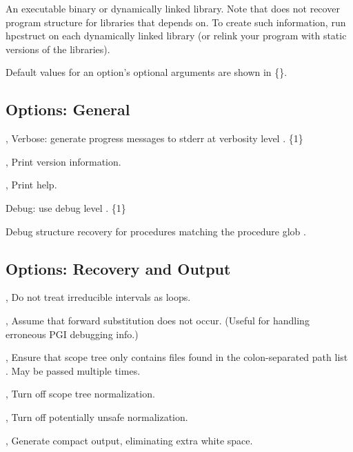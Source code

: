 \documentclass[english]{article}
\begin{document}
\begin{Description}
\item[\Arg{binary}] An executable binary or dynamically linked library.
Note that  does not recover program structure for libraries that  depends on.  To create such information, run hpcstruct on each dynamically linked library (or relink your program with static versions of the libraries).
\end{Description}

Default values for an option's optional arguments are shown in \{\}.

\subsection{Options: General}

\begin{Description}
\item[\OptoArg{-v}{n}, \OptoArg{--verbose}{n}]
Verbose: generate progress messages to stderr at verbosity level .  \{1\}

\item[\Opt{-V}, \Opt{--version}]
Print version information.

\item[\Opt{-h}, \Opt{--help}]
Print help.

\item[\OptoArg{--debug}{n}]
Debug: use debug level . \{1\}

\item[\OptArg{--debug-proc}{glob}]
Debug structure recovery for procedures matching the procedure glob .
\end{Description}

\subsection{Options: Recovery and Output}

\begin{Description}
  \item[\Opt{-i}, \Opt{--irreducible-interval-as-loop-off}] Do not treat irreducible intervals as loops.
  \item[\Opt{-f}, \Opt{--forward-substitution-off}] Assume that forward substitution does not occur.  (Useful for handling erroneous PGI debugging info.)

  \item[\OptArg{-p}{path-list}, \OptArg{--canonical-paths}{path-list}] Ensure that scope tree only contains files found in the colon-separated path list . May be passed multiple times.

\item[\Opt{-n}, \Opt{--normalize-off}] Turn off scope tree normalization.
\item[\Opt{-u}, \Opt{--unsafe-normalize-off}] Turn off potentially unsafe normalization.

\item[\Opt{-c}, \Opt{--compact}] Generate compact output, eliminating extra white space.
\end{Description}
\end{document}
